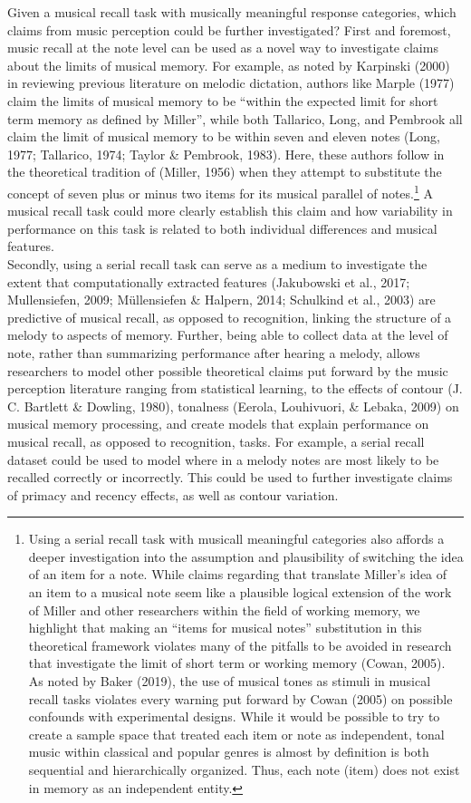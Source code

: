 \documentclass[english,man]{apa6}
\begin{document}
Given a musical recall task with musically meaningful response categories, which claims from music perception could be further investigated?
First and foremost, music recall at the note level can be used as a novel way to investigate claims about the limits of musical memory. For example, as noted by Karpinski (2000) in reviewing previous literature on melodic dictation, authors like Marple (1977) claim the limits of musical memory to be \enquote{within the expected limit for short term memory as defined by Miller}, while both Tallarico, Long, and Pembrook all claim the limit of musical memory to be within seven and eleven notes (Long, 1977; Tallarico, 1974; Taylor \& Pembrook, 1983).
Here, these authors follow in the theoretical tradition of (Miller, 1956) when they attempt to substitute the concept of seven plus or minus two items for its musical parallel of notes.\footnote{Using a serial recall task with musicall meaningful categories also affords a deeper investigation into the assumption and plausibility of switching the idea of an item for a note. While claims regarding that translate Miller's idea of an item to a musical note seem like a plausible logical extension of the work of Miller and other researchers within the field of working memory, we highlight that making an ``items for musical notes'' substitution in this theoretical framework violates many of the pitfalls to be avoided in research that investigate the limit of short term or working memory (Cowan, 2005). As noted by Baker (2019), the use of musical tones as stimuli in musical recall tasks violates every warning put forward by Cowan (2005) on possible confounds with experimental designs. While it would be possible to try to create a sample space that treated each item or note as independent, tonal music within classical and popular genres is almost by definition is both sequential and hierarchically organized. Thus, each note (item) does not exist in memory as an independent entity.}
A musical recall task could more clearly establish this claim and how variability in performance on this task is related to both individual differences and musical features.\\
Secondly, using a serial recall task can serve as a medium to investigate the extent that computationally extracted features (Jakubowski et al., 2017; Mullensiefen, 2009; Müllensiefen \& Halpern, 2014; Schulkind et al., 2003) are predictive of musical recall, as opposed to recognition, linking the structure of a melody to aspects of memory.
Further, being able to collect data at the level of note, rather than summarizing performance after hearing a melody, allows researchers to model other possible theoretical claims put forward by the music perception literature ranging from statistical learning, to the effects of contour (J. C. Bartlett \& Dowling, 1980), tonalness (Eerola, Louhivuori, \& Lebaka, 2009) on musical memory processing, and create models that explain performance on musical recall, as opposed to recognition, tasks.
For example, a serial recall dataset could be used to model where in a melody notes are most likely to be recalled correctly or incorrectly. This could be used to further investigate claims of primacy and recency effects, as well as contour variation.
\end{document}
